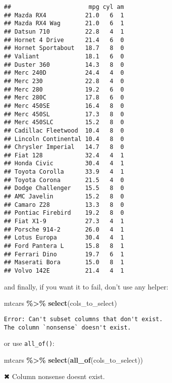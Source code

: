 \documentclass[
]{article}
\newenvironment{Shaded}{\begin{snugshade}}{\end{snugshade}}
\newcommand{\DataTypeTok}[1]{\textcolor[rgb]{0.13,0.29,0.53}{#1}}
\newcommand{\KeywordTok}[1]{\textcolor[rgb]{0.13,0.29,0.53}{\textbf{#1}}}
\newcommand{\NormalTok}[1]{#1}
\newcommand{\OperatorTok}[1]{\textcolor[rgb]{0.81,0.36,0.00}{\textbf{#1}}}
\newcommand{\StringTok}[1]{\textcolor[rgb]{0.31,0.60,0.02}{#1}}
\begin{document}
\begin{verbatim}
##                      mpg cyl am
## Mazda RX4           21.0   6  1
## Mazda RX4 Wag       21.0   6  1
## Datsun 710          22.8   4  1
## Hornet 4 Drive      21.4   6  0
## Hornet Sportabout   18.7   8  0
## Valiant             18.1   6  0
## Duster 360          14.3   8  0
## Merc 240D           24.4   4  0
## Merc 230            22.8   4  0
## Merc 280            19.2   6  0
## Merc 280C           17.8   6  0
## Merc 450SE          16.4   8  0
## Merc 450SL          17.3   8  0
## Merc 450SLC         15.2   8  0
## Cadillac Fleetwood  10.4   8  0
## Lincoln Continental 10.4   8  0
## Chrysler Imperial   14.7   8  0
## Fiat 128            32.4   4  1
## Honda Civic         30.4   4  1
## Toyota Corolla      33.9   4  1
## Toyota Corona       21.5   4  0
## Dodge Challenger    15.5   8  0
## AMC Javelin         15.2   8  0
## Camaro Z28          13.3   8  0
## Pontiac Firebird    19.2   8  0
## Fiat X1-9           27.3   4  1
## Porsche 914-2       26.0   4  1
## Lotus Europa        30.4   4  1
## Ford Pantera L      15.8   8  1
## Ferrari Dino        19.7   6  1
## Maserati Bora       15.0   8  1
## Volvo 142E          21.4   4  1
\end{verbatim}

and finally, if you want it to fail, don't use any helper:

\begin{Shaded}
\begin{Highlighting}[]
\NormalTok{mtcars }\OperatorTok{\%\textgreater{}\%}
\StringTok{  }\KeywordTok{select}\NormalTok{(cols\_to\_select)}
\end{Highlighting}
\end{Shaded}

\begin{verbatim}
Error: Can't subset columns that don't exist.
The column `nonsense` doesn't exist.
\end{verbatim}

or use \texttt{all\_of()}:

\begin{Shaded}
\begin{Highlighting}[]
\NormalTok{mtcars }\OperatorTok{\%\textgreater{}\%}
\StringTok{  }\KeywordTok{select}\NormalTok{(}\KeywordTok{all\_of}\NormalTok{(cols\_to\_select))}
\end{Highlighting}
\end{Shaded}

\begin{Shaded}
\begin{Highlighting}[]
\NormalTok{✖ Column }\StringTok{\textasciigrave{}}\DataTypeTok{nonsense}\StringTok{\textasciigrave{}}\NormalTok{ doesn}\StringTok{\textquotesingle{}t exist.}
\end{Highlighting}
\end{Shaded}
\end{document}
